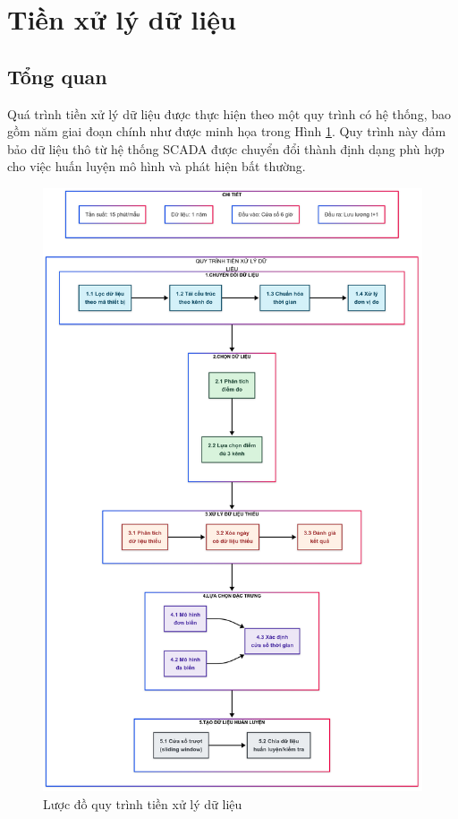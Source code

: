 \section{Tiền xử lý dữ liệu}
\subsection{Tổng quan}

Quá trình tiền xử lý dữ liệu được thực hiện theo một quy trình có hệ thống, bao gồm năm giai đoạn chính như được minh họa trong Hình \ref{fig:data_preprocessing_flow}. Quy trình này đảm bảo dữ liệu thô từ hệ thống SCADA được chuyển đổi thành định dạng phù hợp cho việc huấn luyện mô hình và phát hiện bất thường.

\begin{figure}[H]
    \centering
    \includegraphics[width=\textwidth]{image/section6_1/luoc_do_tien_xu_ly_du_lieu.png}
    \caption{Lược đồ quy trình tiền xử lý dữ liệu}
    \label{fig:data_preprocessing_flow}
\end{figure}

